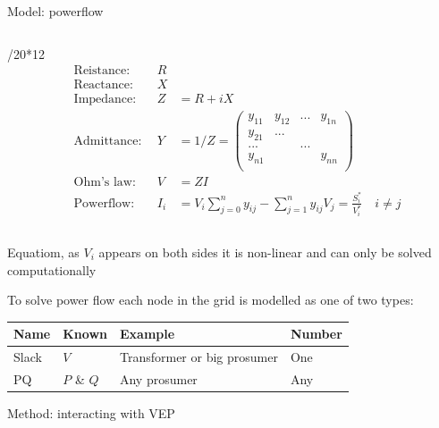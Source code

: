 \documentclass[final]{beamer}
\newlength{\colwidth}
\begin{document}
\begin{frame}[t]
\begin{columns}[t]
\begin{column}{\colwidth}
\begin{block}{Model: powerflow}
\begin{columns}[t]
\begin{column}{\colwidth/20*12}
      \begin{equation}
        \begin{aligned}
          &\text{Reistance}: \ \ & R\\
          &\text{Reactance}: \ \ & X\\
          &\text{Impedance}: \ \ & Z   &= R + iX\\
          &\text{Admittance}:\ \ & Y   &= 1/Z = \begin{pmatrix}y_{11}&y_{12}&...&y_{1n}\\y_{21}&...&&\\...&&...&\\y_{n1}&&&y_{nn}\\\end{pmatrix}\\
          &\text{Ohm's law}: \ \ & V   &= Z I \\
          &\text{Powerflow}: \ \ & I_i &= V_i \sum_{j=0}^n y_{ij} - \sum_{j=1}^n y_{ij} V_j = \frac{S_i^*}{V_i^*} \quad i \neq j
        \end{aligned}
        \label{eq:}
      \end{equation}
      
    \end{column}

  \end{columns}

  \vspace{1cm}


  Equatiom, as $V_i$ appears on both sides it is non-linear and
  can only be solved computationally

  To solve power flow each node in the grid is modelled as one of two types:

  \begin{center}
    \begin{tabular}{ llll } 
     Name & Known       & Example                     & Number \\ 
     \hline
     Slack& $V$         & Transformer or big prosumer & One\\
     PQ   & $P$ \& $Q$  & Any prosumer                & Any\\
    \end{tabular}
  \end{center}


  \end{block}


  \begin{block}{Method: interacting with VEP}

    \begin{figure}
      \centering
      \begin{tikzpicture}[scale=2]


\end{tikzpicture}
\end{figure}
\end{block}
\end{column}
\end{columns}
\end{frame}
\end{document}
